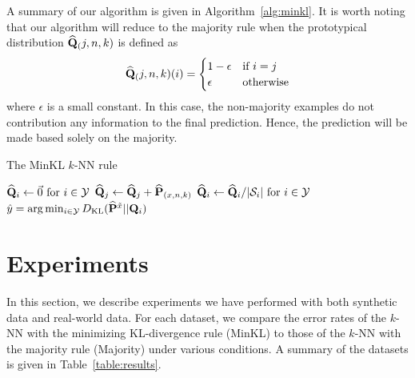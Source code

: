 \documentclass{article}
\begin{document}
A summary of our algorithm is given in Algorithm~\ref{alg:minkl}.
It is worth noting that our algorithm will reduce to the majority
rule when the prototypical distribution
$\widehat{\mathbf{Q}}_(j,n,k)$ is defined as 
\[
\widehat{\mathbf{Q}}_(j,n,k)(i) = \begin{cases} 1-\epsilon &\mbox{if } i = j \\ 
\epsilon & \mbox{otherwise} \end{cases}
\]
where $\epsilon$ is a small constant. In this case, the non-majority
examples do not contribution any information to the final
prediction. Hence, the prediction will be made based solely on the
majority.

\begin{algorithm}
\caption{The MinKL $k$-NN rule}
\label{alg:minkl}
\begin{algorithmic}[1]
\STATE $\widehat{\mathbf{Q}}_i \leftarrow \vec{0} \mbox{ for } i \in \mathcal{Y}$
\STATE $\widehat{\mathbf{Q}}_j \leftarrow \widehat{\mathbf{Q}}_j + \widehat{\mathbf{P}}_{(x,n,k)}$
\ENDFOR
\STATE $\widehat{\mathbf{Q}}_i \leftarrow \widehat{\mathbf{Q}}_i / |\mathcal{S}_i| \mbox{ for } i \in \mathcal{Y}$
\STATE $\hat{y} = \arg\min_{i \in \mathcal{Y}} D_{\mathrm{KL}}(\widehat{\mathbf{P}}^{\tilde{x}} || \mathbf{Q}_i)$
\end{algorithmic}
\end{algorithm}

\section{Experiments}
\label{sec:results}
In this section, we describe experiments we have performed with both
synthetic data and real-world data. For each dataset, we compare the
error rates of the $k$-NN with the minimizing KL-divergence rule
(MinKL) to those of the $k$-NN with the majority rule (Majority) under
various conditions. A summary of the datasets is given in
Table~\ref{table:results}.
\end{document}
